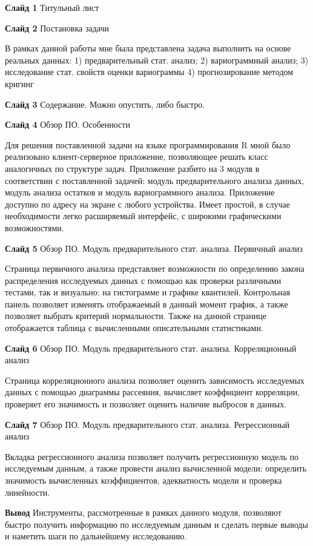 \documentclass[a4paper,10pt]{report}
\begin{document}
\textbf{Слайд 1} Титульный лист

\textbf{Слайд 2} Постановка задачи

В рамках данной работы мне была представлена задача выполнить на основе реальных данных: 1) предварительный стат. анализ; 2) вариограммный анализ; 3) исследование стат. свойств оценки вариограммы 4) прогнозирование методом кригинг

\textbf{Слайд 3} Содержание. Можно опустить, либо быстро.

\textbf{Слайд 4} Обзор ПО. Особенности

Для решения поставленной задачи на языке программирования R мной было реализовано клиент-серверное приложение, позволяющее решать класс аналогичных по структуре задач. Приложение разбито на 3 модуля в соответствии с поставленной задачей: модуль предварительного анализа данных, модуль анализа остатков и  модуль вариограммного анализа. Приложение доступно по адресу на экране с любого устройства. Имеет простой, в случае необходимости легко расширяемый интерфейс, с широкими графическими возможностями.

\textbf{Слайд 5} Обзор ПО. Модуль предварительного стат. анализа. Первичный анализ

Страница первичного анализа представляет возможности по определению закона распределения исследуемых данных с помощью как проверки различными тестами, так и визуально: на гистограмме и графике квантилей. Контрольная панель позволяет изменять отображаемый в данный момент график, а также позволяет выбрать критерий нормальности. Также на данной странице отображается таблица с вычисленными описательными статистиками.

\textbf{Слайд 6} Обзор ПО. Модуль предварительного стат. анализа. Корреляционный анализ

Страница корреляционного анализа позволяет оценить зависимость исследуемых данных с помощью диаграммы рассеяния, вычисляет коэффициент корреляции, проверяет его значимость и позволяет оценить наличие выбросов в данных.

\textbf{Слайд 7} Обзор ПО. Модуль предварительного стат. анализа. Регрессионный анализ

Вкладка регрессионного анализа позволяет получить регрессионную модель по исследуемым данным, а также провести анализ вычисленной модели: определить значимость вычисленных коэффициентов, адекватность модели и проверка линейности.

\textbf{Вывод} Инструменты, рассмотренные в рамках данного модуля, позволяют быстро получить информацию по исследуемым данным и сделать первые выводы и наметить шаги по дальнейшему исследованию.
\end{document}
